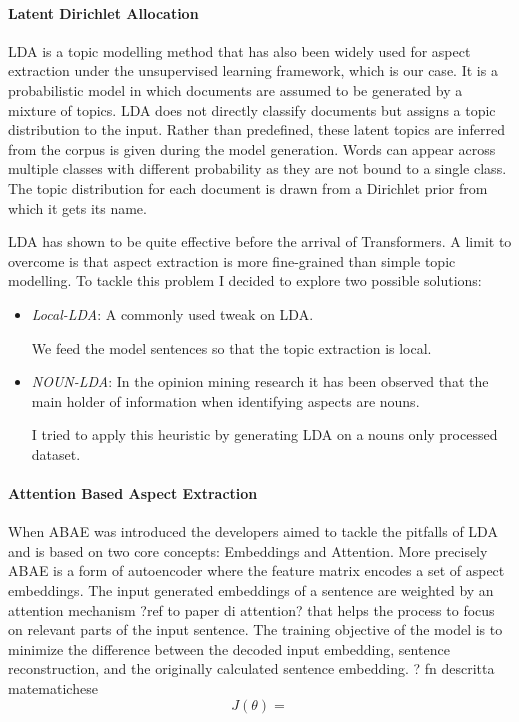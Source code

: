 \paragraph{Latent Dirichlet Allocation}
LDA is a topic modelling method that has also been widely used for aspect extraction under the unsupervised learning framework,
which is our case.
It is a probabilistic model in which documents are assumed to be generated by a mixture of topics.
LDA does not directly classify documents but assigns a topic distribution to the input.
Rather than predefined, these latent topics are inferred from the corpus is given during the model generation.
Words can appear across multiple classes with different probability as they are not bound to a single class.
The topic distribution for each document is drawn from a Dirichlet prior from which it gets its name.

LDA has shown to be quite effective before the arrival of Transformers. A limit to overcome is that aspect extraction
is more fine-grained than simple topic modelling.
To tackle this problem I decided to explore two possible solutions:
\begin{itemize}
    \item{\textit{Local-LDA}}: A commonly used tweak on LDA.

    We feed the model sentences so that the topic extraction is local.
    \item{\textit{NOUN-LDA}}: In the opinion mining research it has been observed that %
    the main holder of information when identifying aspects are nouns.

    I tried to apply this heuristic by generating LDA on a nouns only processed dataset.
\end{itemize}

\paragraph{Attention Based Aspect Extraction}
When ABAE was introduced the developers aimed to tackle the pitfalls of LDA and is based on two core concepts: Embeddings and Attention.
More precisely ABAE is a form of autoencoder where the feature matrix encodes a set of aspect embeddings.
The input generated embeddings of a sentence are weighted by an attention mechanism ?ref to paper di attention?
that helps the process to focus on relevant parts of the input sentence.
The training objective of the model is to minimize the difference between the decoded input embedding, sentence reconstruction,
and the originally calculated sentence embedding.
? fn descritta matematichese
$$J(\theta) = $$

